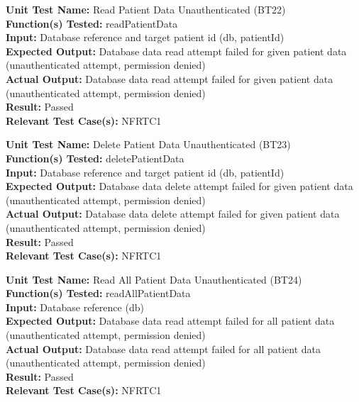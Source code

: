 \documentclass[12pt, titlepage]{article}
\begin{document}
\begin{mdframed}[linewidth=0.5mm]
  \textbf{Unit Test Name:} Read Patient Data Unauthenticated (BT22) \\
  \textbf{Function(s) Tested:} readPatientData \\
  \textbf{Input:} Database reference and target patient id (db, patientId) \\
  \textbf{Expected Output:} Database data read attempt failed for given patient data (unauthenticated attempt, permission denied) \\
  \textbf{Actual Output:} Database data read attempt failed for given patient data (unauthenticated attempt, permission denied) \\
  \textbf{Result:} Passed \\
  \textbf{Relevant Test Case(s):} NFRTC1
\end{mdframed}

\begin{mdframed}[linewidth=0.5mm]
  \textbf{Unit Test Name:} Delete Patient Data Unauthenticated (BT23) \\
  \textbf{Function(s) Tested:} deletePatientData \\
  \textbf{Input:} Database reference and target patient id (db, patientId) \\
  \textbf{Expected Output:} Database data delete attempt failed for given patient data (unauthenticated attempt, permission denied) \\
  \textbf{Actual Output:} Database data delete attempt failed for given patient data (unauthenticated attempt, permission denied) \\
  \textbf{Result:} Passed \\
  \textbf{Relevant Test Case(s):} NFRTC1
\end{mdframed}

\begin{mdframed}[linewidth=0.5mm]
  \textbf{Unit Test Name:} Read All Patient Data Unauthenticated (BT24) \\
  \textbf{Function(s) Tested:} readAllPatientData \\
  \textbf{Input:} Database reference (db) \\
  \textbf{Expected Output:} Database data read attempt failed for all patient data (unauthenticated attempt, permission denied) \\
  \textbf{Actual Output:} Database data read attempt failed for all patient data (unauthenticated attempt, permission denied) \\
  \textbf{Result:} Passed \\
  \textbf{Relevant Test Case(s):} NFRTC1
\end{mdframed}
\end{document}
